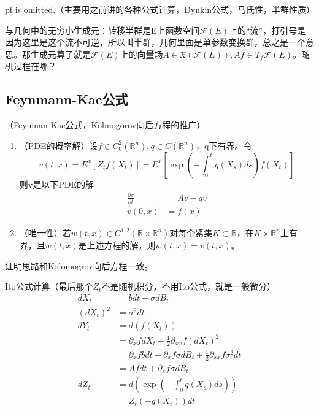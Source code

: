pf is omitted.（主要用之前讲的各种公式计算，Dynkin公式，马氏性，半群性质）

与几何中的无穷小生成元：转移半群是E上函数空间$\mathcal{F}(E)$上的“流”，打引号是因为这里是这个流不可逆，所以叫半群，几何里面是单参数变换群，总之是一个意思。那生成元算子就是$\mathcal{F}(E)$上的向量场$A \in \mathfrak{X}(\mathcal{F}(E)), Af \in T_f \mathcal{F}(E)$。随机过程在哪？

\subsection{Feynmann-Kac公式}

\begin{thm}（Feynman-Kac公式，Kolmogorov向后方程的推广）
  \begin{enumerate}
    \item （PDE的概率解）设$f \in C_{0}^{2}\left(\mathbb{R}^{n}\right), q \in C\left(\mathbb{R}^{n}\right)$，q下有界。令
    \[
      v(t, x)=E^x\left[ Z_t f(X_t) \right]=E^{x}\left[\exp \left(-\int_{0}^{t} q\left(X_{s}\right) d s\right) f\left(X_{t}\right)\right]
    \]
    则v是以下PDE的解
    \[
      \begin{aligned}
        \frac{\partial v}{\partial t}&=A v-q v \\
        v(0, x)&=f(x)
      \end{aligned}
    \] 
    \item （唯一性）若$w(t, x) \in C^{1,2}\left(\mathbb{R} \times \mathbb{R}^{n}\right)$对每个紧集$K \subset \mathbb{R}$，在$K \times \mathbb{R}^{n}$上有界，且$w(t, x)$是上述方程的解，则$w(t, x)=v(t, x)$。
  \end{enumerate}
\end{thm}

证明思路和Kolomogrov向后方程一致。

Ito公式计算（最后那个$Z_t$不是随机积分，不用Ito公式，就是一般微分）
\[
  \begin{aligned}
    dX_t &= bdt + \sigma dB_t \\
    (dX_t)^2 &= \sigma^2 dt \\
    dY_t &= d(f(X_t))\\
    &= \partial_x f dX_t + \frac{1}{2} \partial_{xx} f (dX_t)^2 \\
    &= \partial_x f bdt + \partial_x f \sigma dB_t + \frac{1}{2} \partial_{xx} f \sigma^2 dt \\
    &= Af dt + \partial_x f \sigma dB_t\\
    dZ_t &= d\left(\exp \left(-\int_{0}^{t} q(X_{s}) ds\right)\right)\\
    &= Z_t \left( -q(X_t) \right) dt
  \end{aligned}
\]

